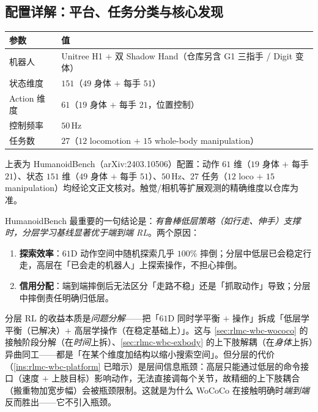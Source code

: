 \subsection{配置详解：平台、任务分类与核心发现}

\begin{center}
\small
\begin{tabular}{ll}
\hline
参数 & 值 \\
\hline
机器人 & Unitree H1 $+$ 双 Shadow Hand（仓库另含 G1 三指手 / Digit 变体） \\
状态维度 & $151$（$49$ 身体 $+$ 每手 $51$） \\
Action 维度 & $61$（$19$ 身体 $+$ 每手 $21$，位置控制） \\
控制频率 & $50$\,Hz \\
任务数 & $27$（$12$ locomotion $+$ $15$ whole-body manipulation） \\
\hline
\end{tabular}
\end{center}

上表为 HumanoidBench（arXiv:2403.10506）配置：动作 $61$ 维（$19$ 身体 $+$ 每手 $21$）、状态 $151$ 维（$49$ 身体 $+$ 每手 $51$）、$50$\,Hz、$27$ 任务（$12$ loco $+$ $15$ manipulation）均经论文正文核对。触觉/相机等扩展观测的精确维度以仓库为准。

HumanoidBench 最重要的一句结论是：\emph{有鲁棒低层策略（如行走、伸手）支撑时，分层学习基线显著优于端到端 RL}。两个原因：

\begin{enumerate}
  \item \textbf{探索效率}：$61$D 动作空间中随机探索几乎 $100\%$ 摔倒；分层中低层已会稳定行走，高层在「已会走的机器人」上探索操作，不担心摔倒。
  \item \textbf{信用分配}：端到端摔倒后无法区分「走路不稳」还是「抓取动作」导致；分层中摔倒责任明确归低层。
\end{enumerate}

\begin{insight}\label{ins:rlmc-wbc-hier}
分层 RL 的收益本质是\emph{问题分解}——把「$61$D 同时学平衡 $+$ 操作」拆成「低层学平衡（已解决）$+$ 高层学操作（在稳定基础上）」。这与 \cref{sec:rlmc-wbc-wococo} 的接触阶段分解（在\emph{时间}上拆）、\cref{sec:rlmc-wbc-exbody} 的上下肢解耦（在\emph{身体}上拆）异曲同工——都是「在某个维度加结构以缩小搜索空间」。但分层的代价（\cref{ins:rlmc-wbc-platform} 已暗示）是层间信息瓶颈：高层只能通过低层的命令接口（速度 $+$ 上肢目标）影响动作，无法直接调每个关节，故精细的上下肢耦合（搬重物加宽步幅）会被瓶颈限制。这就是为什么 WoCoCo 在接触明确时\emph{端到端}反而胜出——它不引入瓶颈。
\end{insight}

